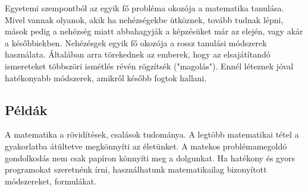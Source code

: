 \documentclass[../Main.tex]{subfiles}
\begin{document}
\begin{flushleft}
    Egyetemi szempontból az egyik fő probléma okozója a matematika tanulása.
    Mivel vannak olyanok, akik ha nehézségekbe ütköznek, tovább tudnak lépni,
    mások pedig a nehézség miatt abbahagyják a képzésüket már az elején, vagy akár a későbbiekben.
    Nehézésgek egyik fő okozója a rossz tanulási módszerek használata.
    Általában arra törekednek az emberek, hogy az elsajátítandó ismereteket többszöri ismétlés
    révén rögzítsék ("magolás"). Ennél léteznek jóval hatékonyabb módszerek, amikről később fogtok hallani.
\end{flushleft}

\subsection{Példák}

\begin{flushleft}
A matematika a rövidítések, csalások tudománya.
A legtöbb matematikai tétel a gyakorlatba átültetve megkönnyíti az életünket.
A matekos problémamegoldó gondolkodás nem csak papíron könnyíti meg a dolgunkat.
Ha hatékony és gyors programokat szeretnénk írni, használhatunk matematikailag bizonyított módszereket, formulákat.
\end{flushleft}
\end{document}
